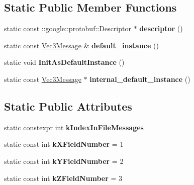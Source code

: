\subsection*{Static Public Member Functions}
\begin{DoxyCompactItemize}
\item 
\mbox{\label{classtbMath_1_1Vec3Message_ab3bab57acb82a121fe159d465af5ef2f}} 
static const \+::google\+::protobuf\+::\+Descriptor $\ast$ {\bfseries descriptor} ()
\item 
\mbox{\label{classtbMath_1_1Vec3Message_a258de594a541db60afa8a7d8c60056b0}} 
static const \hyperlink{classtbMath_1_1Vec3Message}{Vec3\+Message} \& {\bfseries default\+\_\+instance} ()
\item 
\mbox{\label{classtbMath_1_1Vec3Message_ab3baa6ad40cb6ef2664a0df7e3835d61}} 
static void {\bfseries Init\+As\+Default\+Instance} ()
\item 
\mbox{\label{classtbMath_1_1Vec3Message_ab5ab01f7b34345fea32d121926aa7136}} 
static const \hyperlink{classtbMath_1_1Vec3Message}{Vec3\+Message} $\ast$ {\bfseries internal\+\_\+default\+\_\+instance} ()
\end{DoxyCompactItemize}
\subsection*{Static Public Attributes}
\begin{DoxyCompactItemize}
\item 
static constexpr int {\bfseries k\+Index\+In\+File\+Messages}
\item 
\mbox{\label{classtbMath_1_1Vec3Message_acff626670464385e79bb443d13ff7a4f}} 
static const int {\bfseries k\+X\+Field\+Number} = 1
\item 
\mbox{\label{classtbMath_1_1Vec3Message_ac62f703b8354fbc5502d4e274533ca2f}} 
static const int {\bfseries k\+Y\+Field\+Number} = 2
\item 
\mbox{\label{classtbMath_1_1Vec3Message_a0bdb18ced402a57fab047a3e7bb1de94}} 
static const int {\bfseries k\+Z\+Field\+Number} = 3
\end{DoxyCompactItemize}
